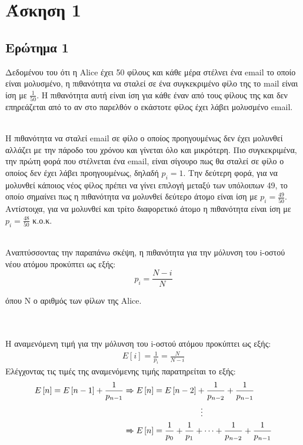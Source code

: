 \section*{Άσκηση 1}
\label{ex1}

\subsection*{Ερώτημα 1}
\label{ex1q1}

Δεδομένου του ότι η Alice έχει 50 φίλους και κάθε μέρα στέλνει ένα email το οποίο είναι μολυσμένο, η πιθανότητα να σταλεί σε ένα συγκεκριμένο φίλο της το mail είναι ίση με $\frac{1}{50}$. Η πιθανότητα αυτή είναι ίση για κάθε έναν από τους φίλους της και δεν επηρεάζεται από το αν στο παρελθόν ο εκάστοτε φίλος έχει λάβει μολυσμένο email.

\noindent\\
Η πιθανότητα να σταλεί email σε φίλο ο οποίος προηγουμένως δεν έχει μολυνθεί  αλλάζει με την πάροδο του χρόνου και γίνεται όλο και μικρότερη. Πιο συγκεκριμένα, την πρώτη φορά που στέλνεται ένα email, είναι σίγουρο πως θα σταλεί σε φίλο ο οποίος δεν έχει λάβει προηγουμένως, δηλαδή $p_i = 1$. Την δεύτερη φορά, για να μολυνθεί κάποιος νέος φίλος πρέπει να γίνει επιλογή μεταξύ των υπόλοιπων 49, το οποίο σημαίνει πως η πιθανότητα να μολυνθεί δεύτερο άτομο είναι ίση με $p_i = \frac{49}{50}$. Αντίστοιχα, για να μολυνθεί και τρίτο διαφορετικό άτομο η πιθανότητα είναι ίση με $p_i = \frac{48}{50}$ κ.ο.κ.

\noindent\\
Αναπτύσσοντας την παραπάνω σκέψη, η πιθανότητα για την μόλυνση του i-οστού νέου ατόμου προκύπτει ως εξής:
\begin{equation}
	p_i  = \frac{N - i}{N} \label{p_i_1}
\end{equation}

όπου Ν ο αριθμός των φίλων της Alice.


\noindent\\\\
Η αναμενόμενη τιμή για την μόλυνση του i-οστού ατόμου προκύπτει ως εξής:
\begin{align}
	E\left[i\right] = \frac{1}{p_i} = \frac{N}{N - i} \label{E_i_1}
\end{align}
Ελέγχοντας τις τιμές της αναμενόμενης τιμής παρατηρείται το εξής:
\begin{align}
	E\left[n\right] = E\left[n - 1\right] + \frac{1}{p_{n-1}} &\xRightarrow{}  E\left[n\right] = E\left[n - 2\right] + \frac{1}{p_{n-2}} + \frac{1}{p_{n-1}}  \notag \\
																										& \hspace{3.3cm} \vdots \notag\\
																										& \xRightarrow{} E\left[n\right] = \frac{1}{p_{0}}  + \frac{1}{p_{1}} + \cdots  + \frac{1}{p_{n-2}} + \frac{1}{p_{n-1}} \notag
\end{align}
 
